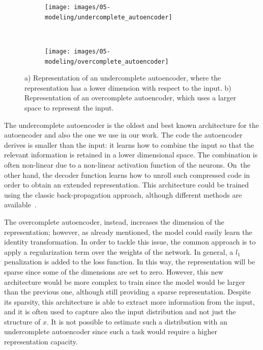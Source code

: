 \begin{figure}[h]
\centering
    \begin{subfigure}[h]{5cm}
        \centering
        \texttt{[image: images/05-modeling/undercomplete\_autoencoder]}
        \caption{}
        \label{fig:undercomplete}
    \end{subfigure}
    ~
    \begin{subfigure}[h]{5cm}
        \centering
        \texttt{[image: images/05-modeling/overcomplete\_autoencoder]}
        \caption{}
        \label{fig:overcomplete}
    \end{subfigure}  \vspace{-6pt}
    \caption{a) Representation of an undercomplete autoencoder, where the representation has a lower dimension with respect to the input. b) Representation of an overcomplete autoencoder, which uses a larger space to represent the input.}
    \label{fig:under_over_autoencoder}
\end{figure}

The undercomplete autoencoder is the oldest and best known architecture for the autoencoder and also the one we use in our work. The code the autoencoder derives is smaller than the input: it learns how to combine the input so that the relevant information is retained in a lower dimensional space. The combination is often non-linear due to a non-linear activation function of the neurons. On~the other hand, the decoder function learns how to unroll such compressed code in order to obtain an extended representation. This architecture could be trained using the classic back-propagation approach, although different methods are available~\citep{goodfellow_deep_2016}.

The overcomplete autoencoder, instead, increases the dimension of the representation; however, as already mentioned, the model could easily learn the identity transformation. In order to tackle this issue, the common approach is to apply a regularization term over the weights of the network. In general, a $l_1$ penalization is added to the loss function.
In this way, the representation will be sparse since some of the dimensions are set to zero.
However, this new architecture would be more complex to train since the model would be larger than the previous one, although still providing a sparse representation. Despite its sparsity, this architecture is able to extract more information from the input, and it is often used to capture also the input distribution and not just the structure of $x$. It is not possible to estimate such a distribution with an undercomplete autoencoder since such a task would require a higher representation capacity.

